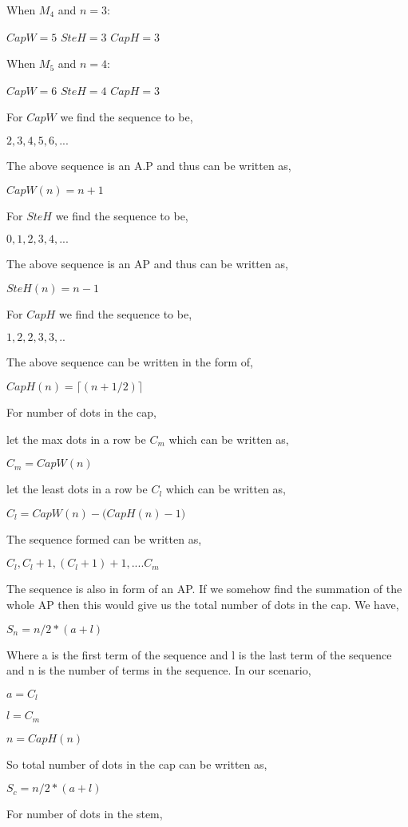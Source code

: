 \documentclass[addpoints]{exam}
\begin{document}
\begin{questions}
\begin{parts}
\begin{solution}
  When $M_4$ and $n=3$:
  
  $CapW=5$
  $SteH=3$
  $CapH=3$
  
  When $M_5$ and $n=4$:
  
  $CapW=6$
  $SteH=4$
  $CapH=3$
  
  For $CapW$ we find the sequence to be,
  
  $2,3,4,5,6,...$
  
  The above sequence is an A.P and thus can be written as,
  
  $CapW(n)=n+1$
  
  For $SteH$ we find the sequence to be,
  
  $0,1,2,3,4,...$
  
  The above sequence is an AP and thus can be written as,
  
  $SteH(n)=n-1$
  
  For $CapH$ we find the sequence to be,
  
  $1,2,2,3,3,..$
  
  The above sequence can be written in the form of,
  
  $CapH(n)=\lceil{(n+1/2)}\rceil$
  
  For number of dots in the cap,
  
  let the max dots in a row be $C_m$ which can be written as,
  
  $C_m=CapW(n)$
  
  let the least dots in a row be $C_l$ which can be written as,
 
  $C_l=CapW(n)-\big(CapH(n)-1 \big)$
  
  The sequence formed can be written as,
  
  $C_l, C_l +1, (C_l +1)+1,.... C_m$
  
  The sequence is also in form of an AP. If we somehow find the summation of the whole AP then this would give us the total number of dots in the cap. We have,
  
  $S_n=n/2 * (a+l)$
  
  Where a is the first term of the sequence and l is the last term of the sequence and n is the number of terms in the sequence. In our scenario,
  
  $a=C_l$
  
  $l=C_m$
  
  $n=CapH(n)$
  
  So total number of dots in the cap can be written as,
  
  $S_c=n/2*(a+l)$
  
  For number of dots in the stem,
  

\end{solution}
\end{parts}
\end{questions}
\end{document}
